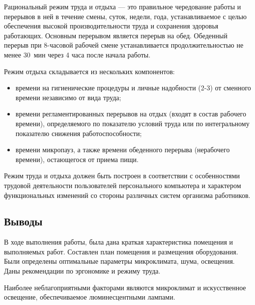 Рациональный режим труда и отдыха --- это правильное чередование работы и перерывов в ней в течение смены, суток, недели, года, устанавливаемое с целью обеспечения высокой производительности труда и сохранения здоровья работающих.
Основным перерывом является перерыв на обед.
Обеденный перерыв при 8-часовой рабочей смене устанавливается продолжительностью не менее 30~мин через 4 часа после начала работы.

Режим отдыха складывается из нескольких компонентов:
\begin{itemize}
  \item времени на гигиенические процедуры и личные надобности (2-3) от сменного времени независимо от вида труда;
  \item времени регламентированных перерывов на отдых (входят в состав рабочего времени), определяемого по показателю условий труда или по интегральному показателю снижения работоспособности;
  \item времени микропауз, а также времени обеденного перерыва (нерабочего времени), остающегося от приема пищи.
\end{itemize}

Режим труда и отдыха должен быть построен в соответствии с особенностями трудовой деятельности пользователей персонального компьютера и характером функциональных изменений со стороны различных систем организма работников.

\subsection{Выводы}

В ходе выполнения работы, была дана краткая характеристика помещения и выполняемых работ.
Составлен план помещения и размещения оборудования.
Были определены оптимальные параметры микроклимата, шума, освещения.
Даны рекомендации по эргономике и режиму труда.

Наиболее неблагоприятными факторами являются микроклимат и искусственное освещение, обеспечиваемое люминесцентными лампами.

\clearpage
